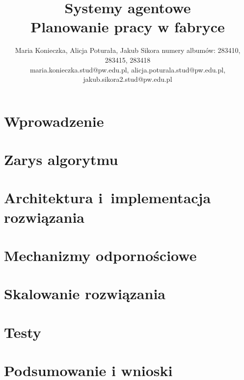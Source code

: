 \documentclass{article}
\title{Systemy agentowe\\ Planowanie pracy w fabryce}
\author{
Maria Konieczka, Alicja Poturała, Jakub Sikora
\affiliations
numery albumów: 283410, 283415, 283418 \\
\emails
maria.konieczka.stud@pw.edu.pl, alicja.poturala.stud@pw.edu.pl, jakub.sikora2.stud@pw.edu.pl
}
\begin{document}
\maketitle

\section{Wprowadzenie}
\label{sec:wprowadzenie}


\section{Zarys algorytmu}
\label{sec:algorytm}


\section{Architektura i~implementacja rozwiązania}
\label{sec:architektura}


\section{Mechanizmy odpornościowe}
\label{sec:recovery}


\section{Skalowanie rozwiązania}
\label{sec:skalowanie}


\section{Testy}
\label{sec:testy}


\section{Podsumowanie i wnioski}
\label{sec:podsumowanie}




\end{document}
